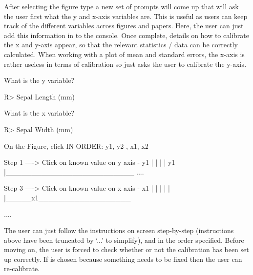 \documentclass[article]{jss}
\newcommand{\fct}[1]{\code{#1()}}
\begin{document}
After selecting the figure type a new set of prompts will come up that will ask the user first what the y and x-axis variables are. This is useful as users can keep track of the different variables across figures and papers. Here, the user can just add this information in to the  console. Once complete, details on how to calibrate the x and y-axis appear, so that the relevant statistics / data can be correctly calculated. When working with a plot of mean and standard errors, the x-axis is rather useless in terms of calibration so \fct{metaDigitise} just asks the user to calibrate the y-axis. 

\begin{CodeChunk}
\begin{CodeOutput}
What is the y variable? 
\end{CodeOutput}
\begin{CodeInput}
R> Sepal Length (mm)
\end{CodeInput}

\begin{CodeOutput}
What is the x variable? 
\end{CodeOutput}
\begin{CodeInput}
R> Sepal Width (mm)
\end{CodeInput}

\begin{CodeOutput}
On the Figure, click IN ORDER: 
      y1, y2 , x1, x2  


    Step 1 ----> Click on known value on y axis - y1
  |
  |
  |
  |
  y1
  |_________________________
  ....

    Step 3 ----> Click on known value on x axis - x1
  |
  |
  |
  |
  |
  |_____x1__________________

  ....
\end{CodeOutput}
\end{CodeChunk}

The user can just follow the instructions on screen step-by-step (instructions above have been truncated by `...' to simplify), and in the order specified. Before moving on, the user is forced to check whether or not the calibration has been set up correctly. If  is chosen because something needs to be fixed then the user can re-calibrate.
\end{document}
